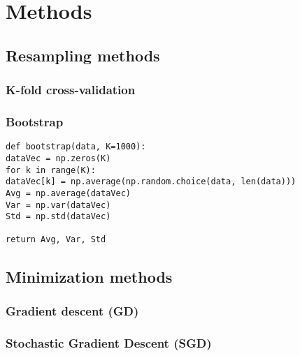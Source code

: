 \section{Methods} \label{sec:methods}

\subsection{Resampling methods}
\subsubsection{K-fold cross-validation}

\subsubsection{Bootstrap}
\lstset{basicstyle=\scriptsize}
\begin{lstlisting}
def bootstrap(data, K=1000):
dataVec = np.zeros(K)
for k in range(K):
dataVec[k] = np.average(np.random.choice(data, len(data)))
Avg = np.average(dataVec)
Var = np.var(dataVec)
Std = np.std(dataVec)

return Avg, Var, Std
\end{lstlisting}

\subsection{Minimization methods}

\subsubsection{Gradient descent (GD)}

\subsubsection{Stochastic Gradient Descent (SGD)}

